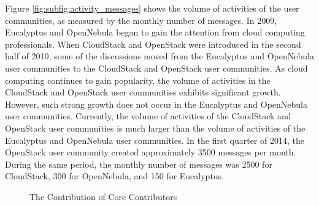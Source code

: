 \documentclass[conference]{IEEEtran}
\begin{document}
Figure \ref{fig:subfig:activity_messages} shows the volume of activities of the user communities, as measured by the monthly number of messages. In 2009, Eucalyptus and OpenNebula began to gain the attention from cloud computing professionals. When CloudStack and OpenStack were introduced in the second half of 2010, some of the discussions moved from the Eucalyptus and OpenNebula user communities to the CloudStack and OpenStack user communities. As cloud computing continues to gain popularity, the volume of activities in the CloudStack and OpenStack user communities exhibits significant growth. However, such strong growth does not occur in the Eucalyptus and OpenNebula user communities. Currently, the volume of activities of the CloudStack and OpenStack user communities is much larger than the volume of activities of the Eucalyptus and OpenNebula user communities. In the first quarter of 2014, the OpenStack user community created approximately 3500 messages per month. During the same period, the monthly number of messages was 2500 for CloudStack, 300 for OpenNebula, and 150 for Eucalyptus. 


\begin{figure}[t!]
\centering
  \hspace{50pt} 
  \caption{The Contribution of Core Contributors} 
  \vspace{-10pt}
  \label{fig:core_contributor} 
\end{figure}
\end{document}
